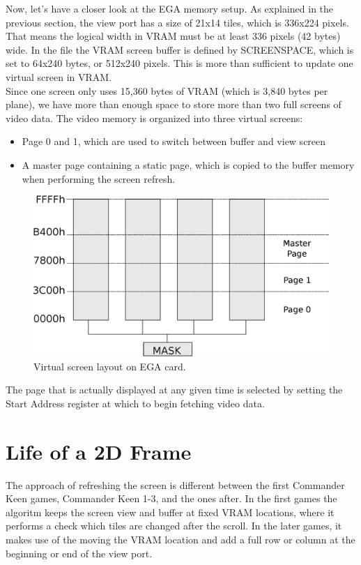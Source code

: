 \documentclass[book.tex]{subfiles}
\begin{document}
Now, let's have a closer look at the EGA memory setup. As explained in the previous section, the view port has a size of 21x14 tiles, which is 336x224 pixels. That means the logical width in VRAM must be at least 336 pixels (42 bytes) wide. In the file  the VRAM screen buffer is defined by SCREENSPACE, which is set to 64x240 bytes, or 512x240 pixels. This is more than sufficient to update one virtual screen in VRAM.\\

Since one screen only uses 15,360 bytes of VRAM (which is 3,840 bytes per plane), we have more than enough space to store more than two full screens of video data. The video memory is organized into three virtual screens:
\begin{itemize}
\item Page 0 and 1, which are used to switch between buffer and view screen
\item A master page containing a static page, which is copied to the buffer memory when performing the screen refresh.
\end{itemize}
\par

\begin{figure}[H]
\centering
\includegraphics[width=\textwidth]{imgs/drawings/ega_ram_architecture.eps}
\caption{Virtual screen layout on EGA card.}
\label{fig:ega_ram_arch}
\end{figure}

The page that is actually displayed at any given time is selected by setting the Start Address register at which to begin fetching video data.\\




\section{Life of a 2D Frame}
The approach of refreshing the screen is different between the first Commander Keen games, Commander Keen 1-3, and the ones after. In the first games the algoritm keeps the screen view and buffer at fixed VRAM locations, where it performs a check which tiles are changed after the scroll. In the later games, it makes use of the moving the VRAM location and add a full row or column at the beginning or end of the view port. 
\\
\end{document}
